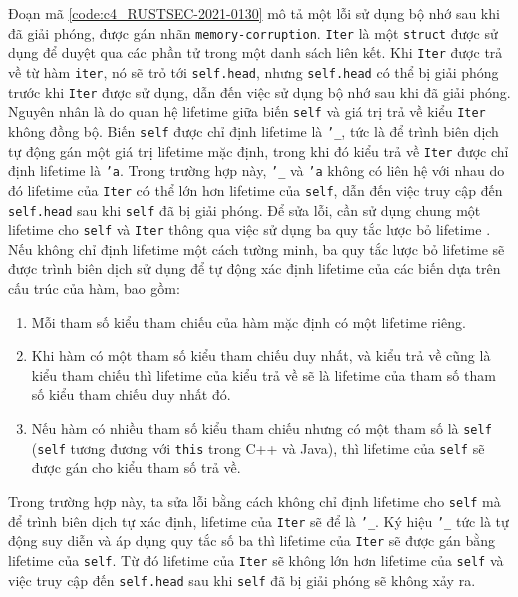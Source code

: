 Đoạn mã \ref{code:c4_RUSTSEC-2021-0130} mô tả một lỗi sử dụng bộ nhớ sau khi đã giải phóng, được gán nhãn \texttt{memory-corruption}.
\texttt{Iter} là một \texttt{struct} được sử dụng để duyệt qua các phần tử trong một danh sách liên kết.
Khi \texttt{Iter} được trả về từ hàm \texttt{iter}, nó sẽ trỏ tới \texttt{self.head}, nhưng \texttt{self.head} có thể bị giải phóng trước khi \texttt{Iter} được sử dụng, dẫn đến việc sử dụng bộ nhớ sau khi đã giải phóng.
Nguyên nhân là do quan hệ lifetime giữa biến \texttt{self} và giá trị trả về kiểu \texttt{Iter} không đồng bộ.
Biến \texttt{self} được chỉ định lifetime là \texttt{'\_}, tức là để trình biên dịch tự động gán một giá trị lifetime mặc định, trong khi đó kiểu trả về \texttt{Iter} được chỉ định lifetime là \texttt{'a}.
Trong trường hợp này, \texttt{'\_} và \texttt{'a} không có liên hệ với nhau do đó lifetime của \texttt{Iter} có thể lớn hơn lifetime của \texttt{self}, dẫn đến việc truy cập đến \texttt{self.head} sau khi \texttt{self} đã bị giải phóng.
Để sửa lỗi, cần sử dụng chung một lifetime cho \texttt{self} và \texttt{Iter} thông qua việc sử dụng ba quy tắc lược bỏ lifetime \cite{rustlangLifetimeElision}.
Nếu không chỉ định lifetime một cách tường minh, ba quy tắc lược bỏ lifetime sẽ được trình biên dịch sử dụng để tự động xác định lifetime của các biến dựa trên cấu trúc của hàm, bao gồm:

\begin{enumerate}
    \item Mỗi tham số kiểu tham chiếu của hàm mặc định có một lifetime riêng.
    \item Khi hàm có một tham số kiểu tham chiếu duy nhất, và kiểu trả về cũng là kiểu tham chiếu thì lifetime của kiểu trả về sẽ là lifetime của tham số tham số kiểu tham chiếu duy nhất đó.
    \item Nếu hàm có nhiều tham số kiểu tham chiếu nhưng có một tham số là \texttt{self} (\texttt{self} tương đương với \texttt{this} trong C++ và Java), thì lifetime của \texttt{self} sẽ được gán cho kiểu tham số trả về.
\end{enumerate}

Trong trường hợp này, ta sửa lỗi bằng cách không chỉ định lifetime cho \texttt{self} mà để trình biên dịch tự xác định, lifetime của \texttt{Iter} sẽ để là \texttt{'\_}.
Ký hiệu \texttt{'\_} tức là tự động suy diễn và áp dụng quy tắc số ba thì lifetime của \texttt{Iter} sẽ được gán bằng lifetime của \texttt{self}.
Từ đó lifetime của \texttt{Iter} sẽ không lớn hơn lifetime của \texttt{self} và việc truy cập đến \texttt{self.head} sau khi \texttt{self} đã bị giải phóng sẽ không xảy ra.

